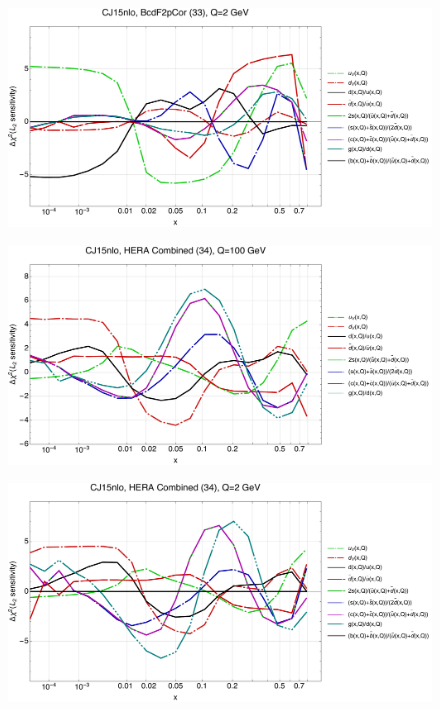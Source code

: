 \documentclass[10pt,aps,prd,floatfix,titlepage]{revtex4}
\begin{document}
\begin{figure}
\includegraphics[width=\textwidth,height=0.44\textheight,keepaspectratio]{2/33_CJ15nlo_q2_Sf_2.pdf}
\caption{}
\end{figure}
\clearpage
\begin{figure}
\includegraphics[width=\textwidth,height=0.44\textheight,keepaspectratio]{2/34_CJ15nlo_q100_Sf_2.pdf}
\caption{}
\end{figure}
\begin{figure}
\includegraphics[width=\textwidth,height=0.44\textheight,keepaspectratio]{2/34_CJ15nlo_q2_Sf_2.pdf}
\caption{}
\end{figure}
\end{document}
